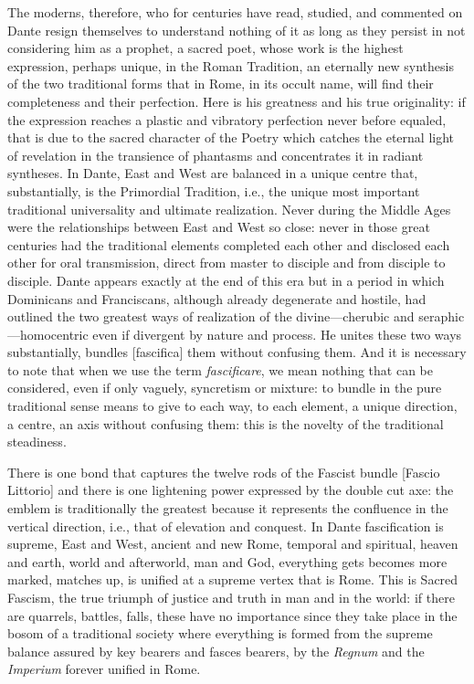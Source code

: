 The moderns, therefore, who for centuries have read, studied, and commented on Dante resign themselves to understand nothing of it as long as they persist in not considering him as a prophet, a sacred poet, whose work is the highest expression, perhaps unique, in the Roman Tradition, an eternally new synthesis of the two traditional forms that in Rome, in its occult name, will find their completeness and their perfection. Here is his greatness and his true originality: if the expression reaches a plastic and vibratory perfection never before equaled, that is due to the sacred character of the Poetry which catches the eternal light of revelation in the transience of phantasms and concentrates it in radiant syntheses. In Dante, East and West are balanced in a unique centre that, substantially, is the Primordial Tradition, i.e., the unique most important traditional universality and ultimate realization. Never during the Middle Ages were the relationships between East and West so close: never in those great centuries had the traditional elements completed each other and disclosed each other for oral transmission, direct from master to disciple and from disciple to disciple. Dante appears exactly at the end of this era but in a period in which Dominicans and Franciscans, although already degenerate and hostile, had outlined the two greatest ways of realization of the divine—cherubic and seraphic—homocentric even if divergent by nature and process. He unites these two ways substantially, bundles [fascifica] them without confusing them. And it is necessary to note that when we use the term \emph{fascificare}, we mean nothing that can be considered, even if only vaguely, syncretism or mixture: to bundle in the pure traditional sense means to give to each way, to each element, a unique direction, a centre, an axis without confusing them: this is the novelty of the traditional steadiness.

There is one bond that captures the twelve rods of the Fascist bundle [Fascio Littorio] and there is one lightening power expressed by the double cut axe: the emblem is traditionally the greatest because it represents the confluence in the vertical direction, i.e., that of elevation and conquest. In Dante fascification is supreme, East and West, ancient and new Rome, temporal and spiritual, heaven and earth, world and afterworld, man and God, everything gets becomes more marked, matches up, is unified at a supreme vertex that is Rome. This is Sacred Fascism, the true triumph of justice and truth in man and in the world: if there are quarrels, battles, falls, these have no importance since they take place in the bosom of a traditional society where everything is formed from the supreme balance assured by key bearers and fasces bearers, by the \emph{Regnum} and the \emph{Imperium} forever unified in Rome.

